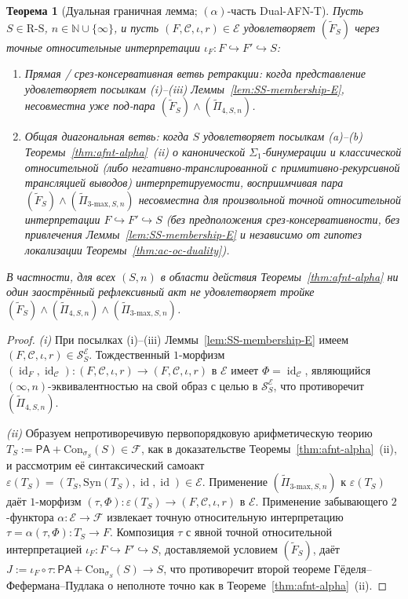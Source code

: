 \documentclass[11pt]{article}
\theoremstyle{plain}
\newtheorem{theorem}{Теорема}[section]
\theoremstyle{definition}
\newcommand{\RS}{\mathrm{R\text{-}S}}
\newcommand{\cS}{\mathcal{S}}
\newcommand{\cF}{\mathcal{F}}
\newcommand{\cC}{\mathcal{C}}
\newcommand{\Syn}{\mathrm{Syn}}
\newcommand{\Con}{\mathrm{Con}}
\newcommand{\PA}{\mathsf{PA}}
\newcommand{\cE}{\mathcal{E}}
\newcommand{\SSE}{\cS_{S}^{\cE}}
\DeclareMathOperator{\id}{id}
\begin{document}
\begin{theorem}[Дуальная граничная лемма; $(\alpha)$-часть Dual-AFN-T]\label{thm:dual-afnt}
Пусть $S \in \RS$, $n \in \mathbb{N} \cup \{\infty\}$, и пусть $(F, \cC, \iota, r) \in \cE$ удовлетворяет $(\tilde{F}_S)$ через точные относительные интерпретации $\iota_F : F \hookrightarrow F' \hookrightarrow S$:
\begin{enumerate}[nosep,label=(\roman*)]
\item \emph{Прямая / срез-консервативная ветвь ретракции}: когда представление удовлетворяет посылкам (i)--(iii) Леммы~\ref{lem:SS-membership-E}, несовместна уже под-пара $(\tilde{F}_S) \wedge (\tilde{\Pi}_{4, S, n})$.
\item \emph{Общая диагональная ветвь}: когда $S$ удовлетворяет посылкам (a)--(b) Теоремы~\ref{thm:afnt-alpha}~(ii) о канонической $\Sigma_1$-бинумерации и классической относительной (либо негативно-транслированной с примитивно-рекурсивной трансляцией выводов) интерпретируемости, восприимчивая пара $(\tilde{F}_S) \wedge (\tilde{\Pi}_{3\text{-max}, S, n})$ несовместна для \emph{произвольной} точной относительной интерпретации $F \hookrightarrow F' \hookrightarrow S$ (без предположения срез-консервативности, без привлечения Леммы~\ref{lem:SS-membership-E} и независимо от гипотез локализации Теоремы~\ref{thm:ac-oc-duality}).
\end{enumerate}
В частности, для всех $(S, n)$ в области действия Теоремы~\ref{thm:afnt-alpha} ни один заострённый рефлексивный акт не удовлетворяет тройке $(\tilde{F}_S) \wedge (\tilde{\Pi}_{4, S, n}) \wedge (\tilde{\Pi}_{3\text{-max}, S, n})$.
\end{theorem}

\begin{proof}
\emph{(i)} При посылках (i)--(iii) Леммы~\ref{lem:SS-membership-E} имеем $(F, \cC, \iota, r) \in \SSE$. Тождественный $1$-морфизм $(\id_F, \id_\cC) : (F, \cC, \iota, r) \to (F, \cC, \iota, r)$ в $\cE$ имеет $\Phi = \id_\cC$, являющийся $(\infty, n)$-эквивалентностью на свой образ с целью в $\SSE$, что противоречит $(\tilde{\Pi}_{4, S, n})$.

\emph{(ii)} Образуем непротиворечивую первопорядковую арифметическую теорию $T_S := \PA + \Con_{\sigma_S}(S) \in \cF$, как в доказательстве Теоремы~\ref{thm:afnt-alpha}~(ii), и рассмотрим её синтаксический самоакт $\varepsilon(T_S) = (T_S, \Syn(T_S), \id, \id) \in \cE$. Применение $(\tilde{\Pi}_{3\text{-max}, S, n})$ к $\varepsilon(T_S)$ даёт $1$-морфизм $(\tau, \Phi) : \varepsilon(T_S) \to (F, \cC, \iota, r)$ в $\cE$. Применение забывающего $2$-функтора $\alpha : \cE \to \cF$ извлекает точную относительную интерпретацию $\tau = \alpha(\tau, \Phi) : T_S \to F$. Композиция $\tau$ с явной точной относительной интерпретацией $\iota_F : F \hookrightarrow F' \hookrightarrow S$, доставляемой условием $(\tilde{F}_S)$, даёт $J := \iota_F \circ \tau : \PA + \Con_{\sigma_S}(S) \to S$, что противоречит второй теореме Гёделя--Фефермана--Пудлака о неполноте точно как в Теореме~\ref{thm:afnt-alpha}~(ii).
\end{proof}
\end{document}
